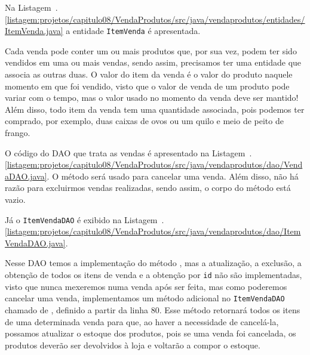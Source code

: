 
Na Listagem~\thechapter.\ref{listagem:projetos/capitulo08/VendaProdutos/src/java/vendaprodutos/entidades/ItemVenda.java} a entidade \texttt{ItemVenda} é apresentada. 


Cada venda pode conter um ou mais produtos que, por sua vez, podem ter sido vendidos em uma ou mais vendas, sendo assim, precisamos ter uma entidade que associa as outras duas. O valor do item da venda é o valor do produto naquele momento em que foi vendido, visto que o valor de venda de um produto pode variar com o tempo, mas o valor usado no momento da venda deve ser mantido! Além disso, todo item da venda tem uma quantidade associada, pois podemos ter comprado, por exemplo, duas caixas de ovos ou um quilo e meio de peito de frango.

O código do DAO que trata as vendas é apresentado na Listagem~\thechapter.\ref{listagem:projetos/capitulo08/VendaProdutos/src/java/vendaprodutos/dao/VendaDAO.java}. O método  será usado para cancelar uma venda. Além disso, não há razão para excluirmos vendas realizadas, sendo assim, o corpo do método está vazio.


Já o \texttt{ItemVendaDAO} é exibido na Listagem~\thechapter.\ref{listagem:projetos/capitulo08/VendaProdutos/src/java/vendaprodutos/dao/ItemVendaDAO.java}.


Nesse DAO temos a implementação do método , mas a atualização, a exclusão, a obtenção de todos os itens de venda e a obtenção por \texttt{id} não são implementadas, visto que nunca mexeremos numa venda após ser feita, mas como poderemos cancelar uma venda, implementamos um método adicional no \texttt{ItemVendaDAO} chamado de , definido a partir da linha 80. Esse método retornará todos os itens de uma determinada venda para que, ao haver a necessidade de cancelá-la, possamos atualizar o estoque dos produtos, pois se uma venda foi cancelada, os produtos deverão ser devolvidos à loja e voltarão a compor o estoque.

